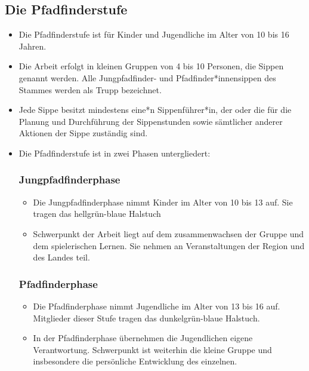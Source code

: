 \documentclass[a4paper]{article}
\begin{document}
    \subsection{Die Pfadfinderstufe}
    \begin{itemize}
        \item Die Pfadfinderstufe ist für Kinder und Jugendliche im Alter von 10 bis 16 Jahren. 
        \item Die Arbeit erfolgt in kleinen Gruppen von 4 bis 10 Personen, die Sippen genannt werden. Alle Jungpfadfinder- und Pfadfinder*innensippen des Stammes werden als Trupp bezeichnet.
        \item Jede Sippe besitzt mindestens eine*n Sippenführer*in, der oder die für die Planung und Durchführung der Sippenstunden sowie sämtlicher anderer Aktionen der Sippe zuständig sind.
        \item Die Pfadfinderstufe ist in zwei Phasen untergliedert:
        \subsubsection{Jungpfadfinderphase}
            \begin{itemize}
                \item Die Jungpfadfinderphase nimmt Kinder im Alter von 10 bis 13 auf. Sie tragen das hellgrün-blaue Halstuch 
                \item Schwerpunkt der Arbeit liegt auf dem zusammenwachsen der Gruppe und dem spielerischen Lernen. Sie nehmen an Veranstaltungen der Region und des Landes teil.
            \end{itemize}
        \subsubsection{Pfadfinderphase}
        \begin{itemize}
            \item Die Pfadfinderphase nimmt Jugendliche im Alter von 13 bis 16 auf. Mitglieder dieser Stufe tragen das dunkelgrün-blaue Halstuch.
            \item In der Pfadfinderphase übernehmen die Jugendlichen eigene Verantwortung. Schwerpunkt ist weiterhin die kleine Gruppe und insbesondere die persönliche Entwicklung des einzelnen.
        \end{itemize}
    \end{itemize}
    
\end{document}
